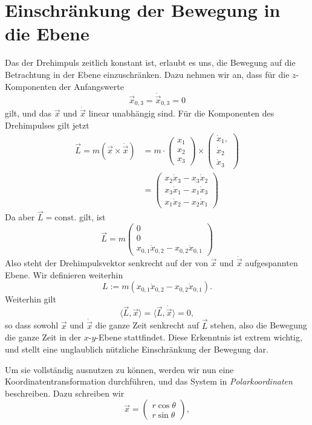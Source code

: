 \section{Einschränkung der Bewegung in die Ebene}
Das der Drehimpuls zeitlich konstant ist, erlaubt es uns, die Bewegung auf die Betrachtung in der Ebene einzuschränken. Dazu nehmen wir an, dass für die $z$-Komponenten der Anfangswerte
\[
  \vec{x}_{0,3} = \dot{\vec{x}}_{0,3} = 0
\]
gilt, und das $\vec{x}$ und $\dot{\vec{x}}$ linear unabhängig sind.
Für die Komponenten des Drehimpulses gilt jetzt
\begin{align*}
\vec{L} = m(\vec{x}\times \dot{\vec{x}}) &= m\cdot \begin{pmatrix} x_1\\x_2\\x_3\end{pmatrix} \times \begin{pmatrix}
  \dot{x}_1,\\\dot{x}_2\\\dot{x}_3\end{pmatrix}\\
  &= \begin{pmatrix} x_2 \dot{x}_3-x_3\dot{x}_2\\ x_3\dot{x}_1 - x_1\dot{x}_3\\ x_1\dot{x}_2 - x_2\dot{x}_1\end{pmatrix}
\end{align*}
Da aber $\vec{L}=\mathrm{const.}$ gilt, ist
\[
\vec{L} =m \begin{pmatrix} 0\\0\\x_{0,1}\dot{x}_{0,2} - x_{0,2}  \dot{x}_{0,1}\end{pmatrix}
\]
Also steht der Drehimpulsvektor senkrecht auf der von $\vec{x}$ und $\dot{\vec{x}}$ aufgespannten Ebene. Wir definieren weiterhin
\[
L:= m(x_{0,1}\dot{x}_{0,2} - x_{0,2}  \dot{x}_{0,1}).
\]
Weiterhin gilt
\[
\langle \vec{L},\vec{x}\rangle = \langle \vec{L},\dot{\vec{x}} \rangle = 0,
\]
so dass sowohl $\vec{x}$ und $\dot{\vec{x}}$ die ganze Zeit senkrecht auf $\vec{L}$ stehen, also die Bewegung die ganze Zeit in der $x$-$y$-Ebene stattfindet. Diese Erkenntnis ist extrem wichtig, und stellt eine unglaublich nützliche Einschränkung der Bewegung dar. \par
Um sie vollständig ausnutzen zu können, werden wir nun eine Koordinatentransformation durchführen, und das System in \emph{Polarkoordinaten} beschreiben. Dazu schreiben wir
\[
\vec{x} = \begin{pmatrix} r\cos \theta\\ r\sin \theta \end{pmatrix},
\]
